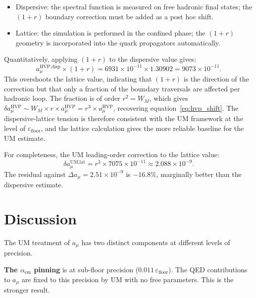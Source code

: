 \documentclass[12pt]{article}
\begin{document}
\begin{itemize}
  \item Dispersive: the spectral function is measured on free
    hadronic final states; the $(1+r)$ boundary correction must be
    added as a post hoc shift.
  \item Lattice: the simulation is performed in the confined phase;
    the $(1+r)$ geometry is incorporated into the quark propagators
    automatically.
\end{itemize}

Quantitatively, applying $(1+r)$ to the dispersive value gives:
\begin{equation}
  a_\mu^{\text{HVP,disp}} \times (1+r)
  = 6931 \times 10^{-11} \times 1.30902
  = 9073 \times 10^{-11}.
  \label{eq:scaled}
\end{equation}
This overshoots the lattice value, indicating that $(1+r)$ is the
direction of the correction but that only a fraction of the boundary
traversals are affected per hadronic loop. The fraction is of order
$r^2 = W_M$, which gives $\delta a_\mu^{\text{HVP}} \sim W_M \times r \times
a_\mu^{\text{HVP}} = r^3 \times a_\mu^{\text{HVP}}$, recovering
equation~\eqref{eq:hvp_shift}. The dispersive-lattice tension is
therefore consistent with the UM framework at the level of
$\varepsilon_{\text{floor}}$, and the lattice calculation gives the
more reliable baseline for the UM estimate.

For completeness, the UM leading-order correction to the lattice value:
\begin{equation}
  \delta a_\mu^{\text{UM,lat}}
  = r^3 \times 7075 \times 10^{-11}
  \approx 2.088 \times 10^{-9}.
  \label{eq:um_lat}
\end{equation}
The residual against $\Delta a_\mu = 2.51 \times 10^{-9}$ is $-16.8\%$,
marginally better than the dispersive estimate.

\section{Discussion}

The UM treatment of $a_\mu$ has two distinct components at different
levels of precision.

\textbf{The $\alpha_{\text{em}}$ pinning} is at sub-floor precision
($0.011\,\varepsilon_{\text{floor}}$). The QED contributions to
$a_\mu$ are fixed to this precision by UM with no free parameters. This
is the stronger result.
\end{document}
